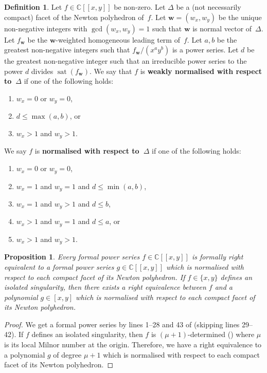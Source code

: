 \documentclass[a4paper, 12pt, oneside]{article}
\theoremstyle{plain}
\newtheorem{proposition}[theorem]{Proposition}
\theoremstyle{definition}
\newtheorem{definition}[theorem]{Definition}
\theoremstyle{remark}
\numberwithin{theorem}{section}
\numberwithin{table}{section}
\numberwithin{equation}{theorem}
\begin{document}
\begin{definition} \label{def:normalised}
Let $f \in \mathbb C[[x, y]]$ be non-zero. Let $\Delta$ be a (not necessarily compact) facet of the Newton polyhedron of~$f$. Let $\bm w = (w_x, w_y)$ be the unique non-negative integers with $\gcd(w_x, w_y) = 1$ such that $\bm w$ is normal vector of~$\Delta$. Let $f_{\bm w}$ be the $\bm w$-weighted homogeneous leading term of~$f$. Let $a, b$ be the greatest non-negative integers such that $f_{\bm w} / (x^a y^b)$ is a power series. Let $d$ be the greatest non-negative integer such that an irreducible power series to the power $d$ divides $\operatorname{sat}(f_{\bm w})$. We say that $f$ is \textbf{weakly normalised with respect to~$\Delta$} if one of the following holds:
\begin{enumerate}[label=(W\arabic*), ref=W\arabic*, leftmargin=3.5em]
\item $w_x = 0$ or $w_y = 0$,
\item $d \leq \max(a, b)$, or
\item $w_x > 1$ and $w_y > 1$.
\end{enumerate}
We say $f$ is \textbf{normalised with respect to~$\Delta$} if one of the following holds:
\begin{enumerate}[label=(N\arabic*), ref=N\arabic*, leftmargin=3.5em]
\item $w_x = 0$ or $w_y = 0$,
\item $w_x = 1$ and $w_y = 1$ and $d \leq \min(a, b)$,
\item $w_x = 1$ and $w_y > 1$ and $d \leq b$,
\item $w_x > 1$ and $w_y = 1$ and $d \leq a$, or
\item $w_x > 1$ and $w_y > 1$.
\end{enumerate}
\end{definition}

\begin{proposition} \label{thm:normalised Newton polyhedron}
Every formal power series $f \in \mathbb C[[x, y]]$ is formally right equivalent to a formal power series $g \in \mathbb C[[x, y]]$ which is normalised with respect to each compact facet of its Newton polyhedron. If $f \in \{x, y\}$ defines an isolated singularity, then there exists a right equivalence between $f$ and a polynomial $g \in [x, y]$ which is normalised with respect to each compact facet of its Newton polyhedron.
\end{proposition}

\begin{proof}
We get a formal power series by lines 1--28 and 43 of \cite[Algorithm~4]{BMP20} (skipping lines 29--42). If $f$ defines an isolated singularity, then $f$ is $(\mu+1)$-determined (\cite[Corollary~2.24]{GLS07}) where $\mu$ is its local Milnor number at the origin. Therefore, we have a right equivalence to a polynomial $g$ of degree $\mu+1$ which is normalised with respect to each compact facet of its Newton polyhedron.
\end{proof}
\end{document}
